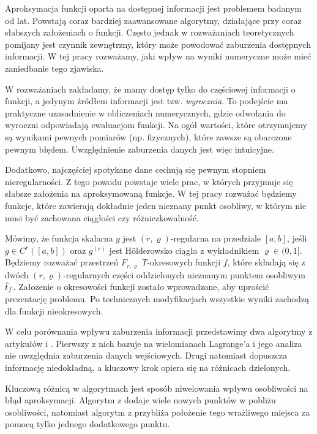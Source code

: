 \documentclass[oik, pdftex, man]{mgrwms}
\begin{document}
\begin{wstep}[Wprowadzenie]
    Aproksymacja funkcji oparta na dostępnej informacji jest problemem badanym od lat. Powstają coraz bardziej zaawansowane algorytmy, działające przy coraz słabszych założeniach o funkcji. Często jednak w rozważaniach teoretycznych pomijany jest czynnik zewnętrzny, który może powodować zaburzenia dostępnych informacji. W tej pracy rozważamy, jaki wpływ na wyniki numeryczne może mieć zaniedbanie tego zjawiska.

    W rozważaniach zakładamy, że mamy dostęp tylko do częściowej informacji o funkcji, a jedynym źródłem informacji jest tzw. \textit{wyrocznia}. To podejście ma praktyczne uzasadnienie w obliczeniach numerycznych, gdzie odwołania do wyroczni odpowiadają ewaluacjom funkcji. Na ogół wartości, które otrzymujemy są wynikami pewnych pomiarów (np. fizycznych), które zawsze są obarczone pewnym błędem. Uwzględnienie zaburzenia danych jest więc intuicyjne.
    
    Dodatkowo, najczęściej spotykane dane cechują się pewnym stopniem nieregularności. Z tego powodu powstaje wiele prac, w których przyjmuje się słabsze założenia na aproksymowaną funkcje. W tej pracy rozważać będziemy funkcje, które zawierają dokładnie jeden nieznany punkt osobliwy, w którym nie musi być zachowana ciągłości czy różniczkowalność.

    Mówimy, że funkcja skalarna $g$ jest $(r, \varrho)$-regularna na przedziale $[a,b]$, jeśli $g \in C^{r}([a,b])$ oraz $g^{(r)}$ jest Hölderowsko ciągła z wykładnikiem $\varrho \in (0,1]$. Będziemy rozważać przestrzeń $F_{r,\varrho}$ $T$-okresowych funkcji $f$, które składają się z dwóch $(r,\varrho)$-regularnych części oddzielonych nieznanym punktem osobliwym $\hat{t}_{f}$. Założenie o okresowości funkcji zostało wprowadzone, aby uprościć prezentację problemu. Po technicznych modyfikacjach wszystkie wyniki zachodzą dla funkcji nieokresowych.

    W celu porównania wpływu zaburzenia informacji przedstawimy dwa algorytmy z artykułów \cite{CoDF} i \cite{AoP}. Pierwszy z nich bazuje na wielomianach Lagrange'a i jego analiza nie uwzględnia zaburzenia danych wejściowych. Drugi natomiast dopuszcza informację niedokładną, a kluczowy krok opiera się na różnicach dzielonych.

    Kluczową różnicą w algorytmach jest sposób niwelowania wpływu osobliwości na błąd aproksymacji. Algorytm z \cite{CoDF} dodaje wiele nowych punktów w pobliżu osobliwości, natomiast algorytm z \cite{AoP} przybliża położenie tego wrażliwego miejsca za pomocą tylko jednego dodatkowego punktu.


\end{wstep}
\end{document}
